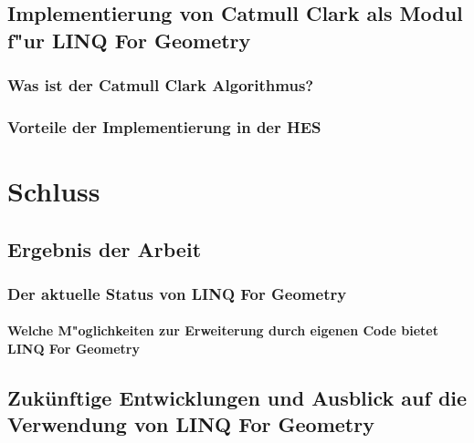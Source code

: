 \documentclass[pagesize, paper=a4, fontsize=12pt,titlepage=true, headings=small, headnosepline, abstractoff, liststotoc, nochapterprefix, plainheadsepline]{scrreprt}
\newcommand{\LFG}{LINQ For Geometry}
\begin{document}
	\section {Implementierung von Catmull Clark als Modul f"ur \LFG}
		\subsection {Was ist der Catmull Clark Algorithmus?}
		\subsection {Vorteile der Implementierung in der HES}





\chapter {Schluss}
	\section {Ergebnis der Arbeit}
		\subsection {Der aktuelle Status von \LFG}
			\subsubsection {Welche M"oglichkeiten zur Erweiterung durch eigenen Code bietet \LFG}
	\section {Zukünftige Entwicklungen und Ausblick auf die Verwendung von \LFG}



\end{document}
